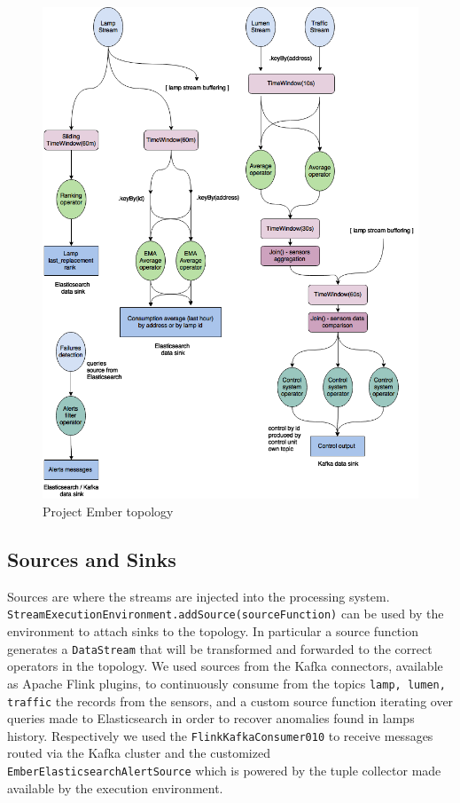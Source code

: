 \begin{figure}
\begin{center}
	\includegraphics[scale=0.3]{img/ember_topology}
	\caption{Project Ember topology}
	\label{fig:ember_topology}
\end{center}
\end{figure}


\subsection{Sources and Sinks}
Sources are where the streams are injected into the processing system. \texttt{StreamExecutionEnvironment.addSource(sourceFunction)} can be used by the environment to attach sinks to the topology. In particular a source function generates a \texttt{DataStream} that will be transformed and forwarded to the correct operators in the topology. We used sources from the Kafka connectors, available as Apache Flink plugins, to continuously consume from the topics \texttt{lamp, lumen, traffic} the records from the sensors, and a custom source function iterating over queries made to Elasticsearch in order to recover anomalies found in lamps history. Respectively we used the \texttt{FlinkKafkaConsumer010} to receive messages routed via the Kafka cluster and the customized \texttt{EmberElasticsearchAlertSource} which is powered by the tuple collector made available by the execution environment.

